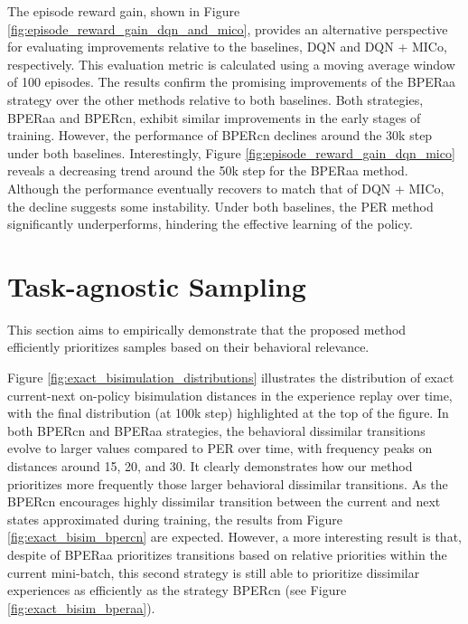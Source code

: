 The episode reward gain, shown in Figure \ref{fig:episode_reward_gain_dqn_and_mico}, provides an alternative perspective for evaluating improvements relative to the baselines, DQN and DQN + MICo, respectively.  This evaluation metric is calculated using a moving average window of 100 episodes. The results confirm the promising improvements of the BPERaa strategy over the other methods relative to both baselines. Both strategies, BPERaa and BPERcn, exhibit similar improvements in the early stages of training. However, the performance of BPERcn declines around the 30k step under both baselines. Interestingly, Figure \ref{fig:episode_reward_gain_dqn_mico} reveals a decreasing trend around the 50k step for the BPERaa method. Although the performance eventually recovers to match that of DQN + MICo, the decline suggests some instability. Under both baselines, the PER method significantly underperforms, hindering the effective learning of the policy.



\section{Task-agnostic Sampling}

This section aims to empirically demonstrate that the proposed method efficiently prioritizes samples based on their behavioral relevance.

Figure \ref{fig:exact_bisimulation_distributions} illustrates the distribution of exact current-next on-policy bisimulation distances in the experience replay over time, with the final distribution (at 100k step) highlighted at the top of the figure. In both BPERcn and BPERaa strategies, the behavioral dissimilar transitions evolve to larger values compared to PER over time, with frequency peaks on distances around 15, 20, and 30. It clearly demonstrates how our method prioritizes more frequently those larger behavioral dissimilar transitions. As the BPERcn encourages highly dissimilar transition between the current and next states approximated during training, the results from Figure \ref{fig:exact_bisim_bpercn} are expected. However, a more interesting result is that, despite of BPERaa prioritizes transitions based on relative priorities within the current mini-batch, this second strategy is still able to prioritize dissimilar experiences as efficiently as the strategy BPERcn (see Figure \ref{fig:exact_bisim_bperaa}).


